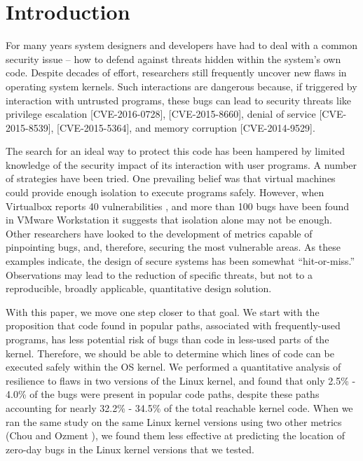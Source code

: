 \section{Introduction}
\label{sec.introduction}

For many years system designers and developers have had to deal with a common security issue --
how to defend against threats hidden within the system's own code. Despite
 decades of effort, researchers still frequently uncover new flaws in operating
 system kernels. Such interactions
are dangerous because, if triggered by
interaction with untrusted programs, these
bugs can lead to security threats like privilege escalation
 [CVE-2016-0728], [CVE-2015-8660], denial of service [CVE-2015-8539], [CVE-2015-5364],
  and memory corruption [CVE-2014-9529].

The search for an ideal way to protect this code has been hampered by limited
knowledge of the security impact of its interaction with user programs.
A number of strategies have been tried. One prevailing belief was that virtual
machines could provide enough isolation to execute programs safely.
However, when Virtualbox reports 40 vulnerabilities \cite{Virtualbox-Vulnerabilities},
 and more than 100 bugs have been found in VMware Workstation
it suggests that isolation alone may not be enough. Other researchers have looked
 to the development of
 metrics capable of pinpointing bugs, and, therefore, securing the most
 vulnerable areas.\cite{PittSFIeld, ozment2006milk} As these examples indicate, the design of
 secure systems has been somewhat “hit-or-miss.” Observations may lead to
 the reduction of specific threats, but not to a reproducible, broadly applicable,
quantitative design solution.

With this paper, we move one step closer to that goal. We start with the proposition
 that code found in popular paths, associated with frequently-used programs,
has less potential risk of bugs than code in less-used parts of the kernel.
Therefore, we should be able to determine which lines of code can be executed
 safely within the OS kernel. We performed a quantitative analysis of resilience
  to flaws in two versions of the Linux kernel, and
found that only 2.5\% - 4.0\% of the bugs were present in popular code paths,
despite these paths accounting for nearly 32.2\% - 34.5\% of the total reachable kernel code.
When we ran the same study on the same Linux kernel versions using two other metrics
(Chou \cite{PittSFIeld} and Ozment \cite{ozment2006milk}),
we found them less effective at predicting the location of zero-day bugs in the
Linux kernel versions that we tested.

